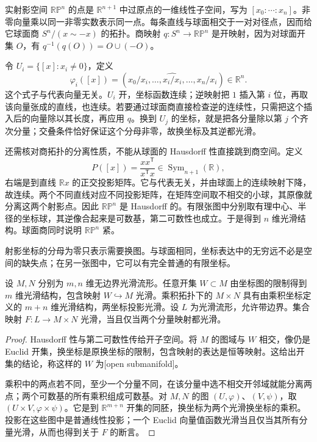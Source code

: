\begin{example}
	\label{g1:exm:projective-smooth-atlas}
	实射影空间 \(\mathbb{RP}^n\) 的点是 \(\mathbb R^{n+1}\) 中过原点的一维线性子空间，写为 \([x_0:\cdots:x_n]\)。非零向量乘以同一非零实数表示同一点。每条直线与球面相交于一对对径点，因而给它球面商 \(S^n/(x\sim-x)\) 的拓扑。商映射 \(q:S^n\to\mathbb{RP}^n\) 是开映射，因为对球面开集 \(O\)，有 \(q^{-1}(q(O))=O\cup(-O)\)。

	令 \(U_i=\{[x]:x_i\neq0\}\)，定义
	\[
		\varphi_i([x])=(x_0/x_i,\ldots,\widehat{x_i/x_i},\ldots,x_n/x_i)\in\mathbb R^n.
	\]
	这个式子与代表向量无关。\(U_i\) 开，坐标函数连续；逆映射把 \(1\) 插入第 \(i\) 位，再取该向量张成的直线，也连续。若要通过球面商直接检查逆的连续性，只需把这个插入后的向量除以其长度，再应用 \(q\)。换到 \(U_j\) 的坐标，就是把各分量除以第 \(j\) 个齐次分量；交叠条件恰好保证这个分母非零，故换坐标及其逆都光滑。

	还需核对商拓扑的分离性质，不能从球面的 Hausdorff 性直接跳到商空间。定义
	\[
		P([x])=\frac{xx^{\mathsf T}}{x^{\mathsf T}x}\in\operatorname{Sym}_{n+1}(\mathbb R),
	\]
	右端是到直线 \(\mathbb Rx\) 的正交投影矩阵。它与代表无关，并由球面上的连续映射下降，故连续。两个不同直线对应不同投影矩阵，在矩阵空间取不相交的小球，其原像就分离这两个射影点。因此 \(\mathbb{RP}^n\) 是 Hausdorff 的。有限张图中分别取有理中心、半径的坐标球，其逆像合起来是可数基，第二可数性也成立。于是得到 \(n\) 维光滑结构。球面商同时说明 \(\mathbb{RP}^n\) 紧。
\end{example}

射影坐标的分母为零只表示需要换图。与球面相同，坐标表达中的无穷远不必是空间的缺失点；在另一张图中，它可以有完全普通的有限坐标。

\begin{proposition}
	\label{g1:prop:basic-smooth-manifolds}
	设 \(M,N\) 分别为 \(m,n\) 维无边界光滑流形。任意开集 \(W\subset M\) 由坐标图的限制得到 \(m\) 维光滑结构，包含映射 \(W\hookrightarrow M\) 光滑。乘积拓扑下的 \(M\times N\) 具有由乘积坐标定义的 \(m+n\) 维光滑结构，两坐标投影光滑。设 \(L\) 为光滑流形，允许带边界。集合映射 \(F:L\to M\times N\) 光滑，当且仅当两个分量映射都光滑。
\end{proposition}

\begin{proof}
	Hausdorff 性与第二可数性传给开子空间。将 \(M\) 的图域与 \(W\) 相交，像仍是 Euclid 开集，换坐标是原换坐标的限制，包含映射的表达是恒等映射。这给出开集的结论，称这样的 \(W\) 为[open submanifold]。

	乘积中的两点若不同，至少一个分量不同，在该分量中选不相交开邻域就能分离两点；两个可数基的所有乘积组成可数基。对 \(M,N\) 的图 \((U,\varphi)\)、\((V,\psi)\)，取 \((U\times V,\varphi\times\psi)\)。它是到 \(\mathbb R^{m+n}\) 开集的同胚，换坐标为两个光滑换坐标的乘积。投影在这些图中是普通线性投影；一个 Euclid 向量值函数光滑当且仅当其所有分量光滑，从而也得到关于 \(F\) 的断言。
\end{proof}

